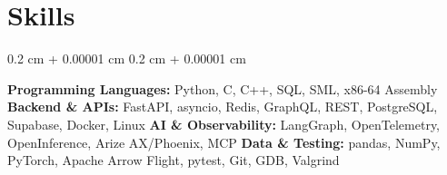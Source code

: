 \documentclass[10pt, letterpaper]{article}
\newenvironment{highlights}{
    \begin{itemize}[
        topsep=0.06 cm,
        parsep=0.06 cm,
        partopsep=0pt,
        itemsep=0pt,
        leftmargin=0.4 cm + 10pt
    ]
}{
    \end{itemize}
} %
\newenvironment{onecolentry}{
    \begin{adjustwidth}{
        0.2 cm + 0.00001 cm
    }{
        0.2 cm + 0.00001 cm
    }
}{
    \end{adjustwidth}
} %
\begin{document}
    \section{Skills}
        \begin{onecolentry}
            \textbf{Programming Languages:} Python, C, C++, SQL, SML, x86-64 Assembly \newline
            \textbf{Backend \& APIs:} FastAPI, asyncio, Redis, GraphQL, REST, PostgreSQL, Supabase, Docker, Linux \newline
            \textbf{AI \& Observability:} LangGraph, OpenTelemetry, OpenInference, Arize AX/Phoenix, MCP \newline
            \textbf{Data \& Testing:} pandas, NumPy, PyTorch, Apache Arrow Flight, pytest, Git, GDB, Valgrind
        \end{onecolentry}
    \vspace{0.10 cm}

    

    
\end{document}

